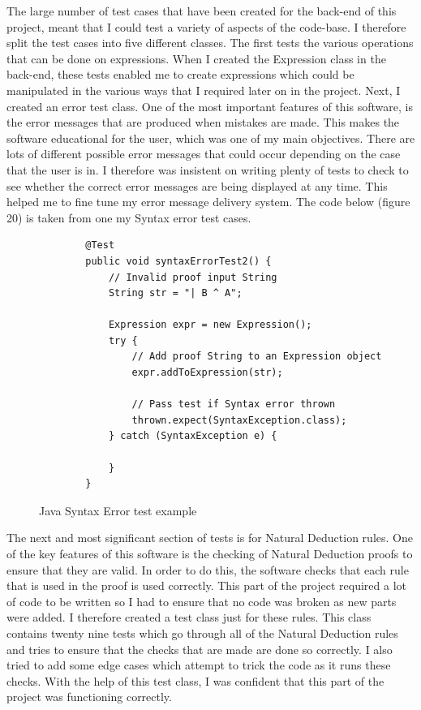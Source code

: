 The large number of test cases that have been created for the back-end of this project, meant that I could test a variety of aspects of the code-base. I therefore split the test cases into five different classes. The first tests the various operations that can be done on expressions. When I created the Expression class in the back-end, these tests enabled me to create expressions which could be manipulated in the various ways that I required later on in the project. Next, I created an error test class. One of the most important features of this software, is the error messages that are produced when mistakes are made. This makes the software educational for the user, which was one of my main objectives. There are lots of different possible error messages that could occur depending on the case that the user is in. I therefore was insistent on writing plenty of tests to check to see whether the correct error messages are being displayed at any time. This helped me to fine tune my error message delivery system. The code below (figure 20) is taken from one my Syntax error test cases.

\begin{figure}[!ht]

	\begin{lstlisting}
		@Test
		public void syntaxErrorTest2() {
			// Invalid proof input String
			String str = "| B ^ A";
	
			Expression expr = new Expression();
			try {
				// Add proof String to an Expression object
				expr.addToExpression(str);
				
				// Pass test if Syntax error thrown
				thrown.expect(SyntaxException.class);
			} catch (SyntaxException e) {
	
			}
		}
	\end{lstlisting}
\caption{Java Syntax Error test example }
\end{figure}

The next and most significant section of tests is for Natural Deduction rules. One of the key features of this software is the checking of Natural Deduction proofs to ensure that they are valid. In order to do this, the software checks that each rule that is used in the proof is used correctly. This part of the project required a lot of code to be written so I had to ensure that no code was broken as new parts were added. I therefore created a test class just for these rules. This class contains twenty nine tests which go through all of the Natural Deduction rules and tries to ensure that the checks that are made are done so correctly. I also tried to add some edge cases which attempt to trick the code as it runs these checks. With the help of this test class, I was confident that this part of the project was functioning correctly.

